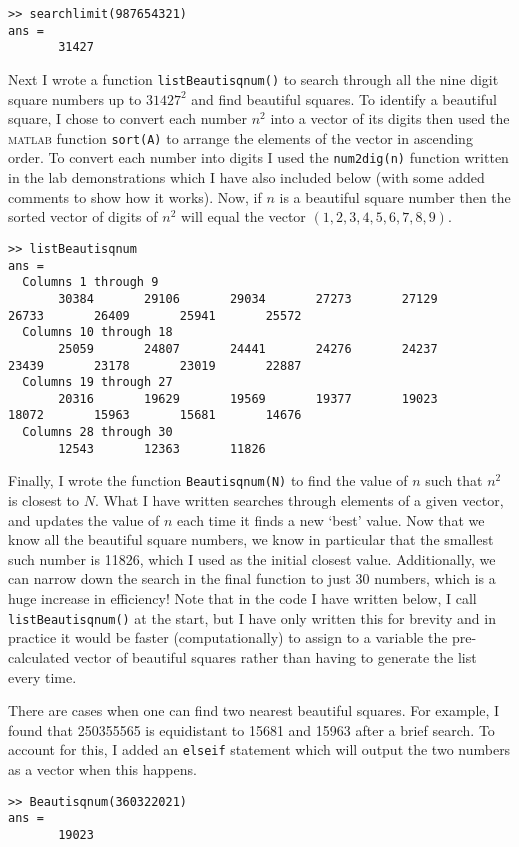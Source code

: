 \documentclass[a4paper,12pt]{article}
\begin{document}


\begin{lstlisting}
>> searchlimit(987654321)
ans =
       31427
\end{lstlisting}

Next I wrote a function \verb!listBeautisqnum()! to search through all the nine digit square numbers up to $31427^2$ and find beautiful squares. To identify a beautiful square, I chose to convert each number $n^2$ into a vector of its digits then used the \textsc{matlab} function \verb!sort(A)! to arrange the elements of the vector in ascending order. To convert each number into digits I used the \verb!num2dig(n)! function written in the lab demonstrations which I have also included below (with some added comments to show how it works). Now, if $n$ is a beautiful square number then the sorted vector of digits of $n^2$ will equal the vector $(1, 2, 3, 4, 5, 6, 7, 8, 9)$.





\begin{lstlisting}
>> listBeautisqnum
ans =
  Columns 1 through 9
       30384       29106       29034       27273       27129       26733       26409       25941       25572
  Columns 10 through 18
       25059       24807       24441       24276       24237       23439       23178       23019       22887
  Columns 19 through 27
       20316       19629       19569       19377       19023       18072       15963       15681       14676
  Columns 28 through 30
       12543       12363       11826
\end{lstlisting}

Finally, I wrote the function \verb!Beautisqnum(N)! to find the value of $n$ such that $n^2$ is closest to $N$. What I have written searches through elements of a given vector, and updates the value of $n$ each time it finds a new `best' value. Now that we know all the beautiful square numbers, we know in particular that the smallest such number is 11826, which I used as the initial closest value. Additionally, we can narrow down the search in the final function to just 30 numbers, which is a huge increase in efficiency! Note that in the code I have written below, I call \verb!listBeautisqnum()! at the start, but I have only written this for brevity and in practice it would be faster (computationally) to assign to a variable the pre-calculated vector of beautiful squares rather than having to generate the list every time.

There are cases when one can find two nearest beautiful squares. For example, I found that 250355565 is equidistant to 15681 and 15963 after a brief search. To account for this, I added an \verb!elseif! statement which will output the two numbers as a vector when this happens.



\begin{lstlisting}
>> Beautisqnum(360322021)
ans =
       19023
\end{lstlisting}
\end{document}
